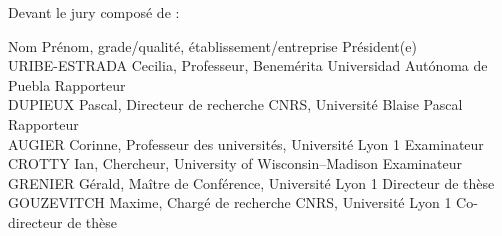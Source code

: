 	{\fontsize{12pt}{14pt}\selectfont
	Devant le jury composé de :\\}
	{\fontsize{11pt}{13pt}\selectfont

	Nom Prénom, grade/qualité, établissement/entreprise \hfill Président(e)\\ %

	URIBE-ESTRADA Cecilia, Professeur, Benemérita Universidad Autónoma de Puebla \hfill Rapporteur\\
	DUPIEUX Pascal, Directeur de recherche CNRS, Université Blaise Pascal \hfill Rapporteur\\
	AUGIER Corinne, Professeur des universités, Université Lyon 1 \hfill Examinateur\\
	CROTTY Ian, Chercheur, University of Wisconsin–Madison \hfill Examinateur\\
	
	GRENIER Gérald, Maître de Conférence, Université Lyon 1 \hfill Directeur de thèse\\
	GOUZEVITCH Maxime, Chargé de recherche CNRS, Université Lyon 1 \hfill Co-directeur de thèse\\}
	\cleardoublepage
	\restoregeometry
